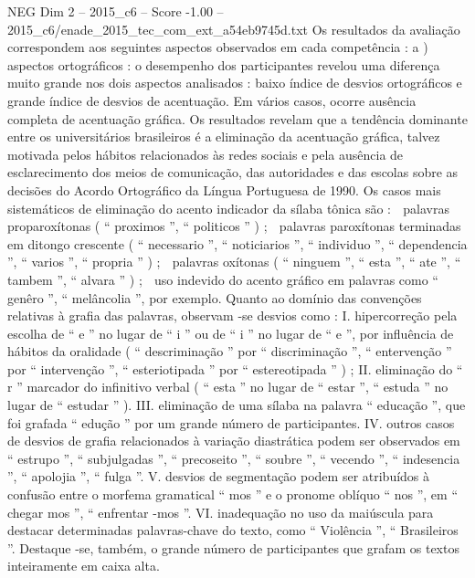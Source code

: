 \begin{textsample}{NEG Dim 2 – 2015\_c6 – Score -1.00 – 2015\_c6/enade\_2015\_tec\_com\_ext\_a54eb9745d.txt}
Os resultados da avaliação correspondem aos seguintes aspectos observados em cada competência : a ) aspectos ortográficos : o desempenho dos participantes revelou uma diferença muito grande nos dois aspectos analisados : baixo índice de desvios ortográficos e grande índice de desvios de acentuação.
Em vários casos, ocorre ausência completa de acentuação gráfica.
Os resultados revelam que a tendência dominante entre os universitários brasileiros é a eliminação da acentuação gráfica, talvez motivada pelos hábitos relacionados às redes sociais e pela ausência de esclarecimento dos meios de comunicação, das autoridades e das escolas sobre as decisões do Acordo Ortográfico da Língua Portuguesa de 1990.
Os casos mais sistemáticos de eliminação do acento indicador da sílaba tônica são :  palavras proparoxítonas ( “ proximos ”, “ politicos ” ) ;  palavras paroxítonas terminadas em ditongo crescente ( “ necessario ”, “ noticiarios ”, “ individuo ”, “ dependencia ”, “ varios ”, “ propria ” ) ;  palavras oxítonas ( “ ninguem ”, “ esta ”, “ ate ”, “ tambem ”, “ alvara ” ) ;  uso indevido do acento gráfico em palavras como “ genêro ”, “ melâncolia ”, por exemplo.
Quanto ao domínio das convenções relativas à grafia das palavras, observam -se desvios como : I. hipercorreção pela escolha de “ e ” no lugar de “ i ” ou de “ i ” no lugar de “ e ”, por influência de hábitos da oralidade ( “ descriminação ” por “ discriminação ”, “ entervenção ” por “ intervenção ”, “ esteriotipada ” por “ estereotipada ” ) ; II. eliminação do “ r ” marcador do infinitivo verbal ( “ esta ” no lugar de “ estar ”, “ estuda ” no lugar de “ estudar ” ).
III. eliminação de uma sílaba na palavra “ educação ”, que foi grafada “ edução ” por um grande número de participantes.
IV. outros casos de desvios de grafia relacionados à variação diastrática podem ser observados em “ estrupo ”, “ subjulgadas ”, “ precoseito ”, “ soubre ”, “ vecendo ”, “ indesencia ”, “ apolojia ”, “ fulga ”.
V. desvios de segmentação podem ser atribuídos à confusão entre o morfema gramatical “ mos ” e o pronome oblíquo “ nos ”, em “ chegar mos ”, “ enfrentar -mos ”.
VI. inadequação no uso da maiúscula para destacar determinadas palavras-chave do texto, como “ Violência ”, “ Brasileiros ”.
Destaque -se, também, o grande número de participantes que grafam os textos inteiramente em caixa alta.

\end{textsample}
